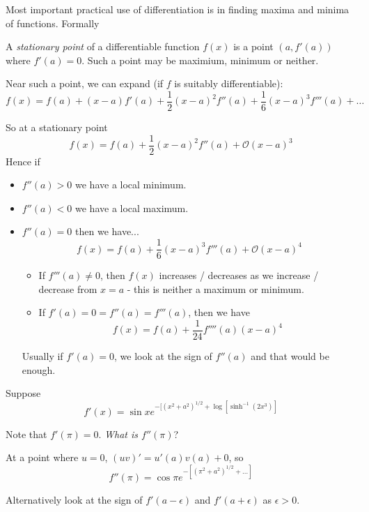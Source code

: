 \documentclass[10pt]{scrartcl}
\begin{document}

Most important  practical use of differentiation is in finding maxima and minima of functions. Formally\vspace*{5pt}

\begin{definition}
A \emph{stationary point} of a differentiable function $f(x)$ is a point $(a, f'(a))$ where $f'(a) = 0$. Such a point may be maximium, minimum or neither. 
\end{definition}

Near such a point, we can expand (if $f$ is suitably differentiable): 
\[f(x) = f(a) + (x-a)f'(a) + \frac{1}{2}(x-a)^2f''(a) + \frac{1}{6}(x-a)^3f'''(a) + \dots \]

So at a stationary point
\[f(x) = f(a) + \frac{1}{2}(x-a)^2f''(a) + \mathcal{O}(x-a)^3\]
Hence if 
\begin{itemize}
  \item $f''(a) > 0$ we have a local minimum.
  \item $f''(a) < 0$ we have a  local maximum.
  \item $f''(a) = 0$ then we have...
  \[f(x) = f(a) + \frac{1}{6}(x-a)^3f'''(a) + \mathcal{O}(x-a)^4\]

\begin{itemize}
  \item If $f'''(a) \neq 0$, then $f(x)$ increases / decreases as we increase / decrease from $x=a$ - this is neither a maximum or minimum. 


\item If $f'(a) = 0 = f''(a) = f'''(a)$, then we have 
\[f(x) = f(a) + \frac{1}{24}f''''(a)(x-a)^4\]
\end{itemize}

Usually if $f'(a) = 0$, we look at the sign of $f''(a)$ and that would be enough. 
\end{itemize}\vspace*{10pt}

\begin{example}
Suppose
\[f'(x) = \sin x e^{-[(x^2 + a^2)^{1/2} + \log[\sinh^{-1}(2x^3)]}\]	

Note that $f'(\pi) = 0$. \emph{What is $f''(\pi)$}? 

At a point where $u = 0$, $(uv)' = u'(a)v(a) + 0$, so 
\[f''(\pi) = \cos\pi e^{-[(\pi^2+a^2)^{1/2} + \dots ]} \]

Alternatively look at the sign of $f'(a-\epsilon)$ and $f'(a+\epsilon)$ as $\epsilon >0$. 
\end{example}
\end{document}
